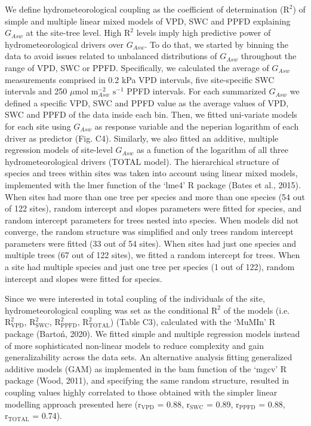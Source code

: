 \documentclass[11pt,twoside]{reedthesis}
\begin{document}
We define hydrometeorological coupling as the coefficient of
determination (\(\text{R}^2\)) of simple and multiple linear mixed
models of VPD, SWC and PPFD explaining \(G_{Asw}\) at the site-tree
level. High \(\text{R}^2\) levels imply high predictive power of
hydrometeorological drivers over \(G_{Asw}\). To do that, we started by
binning the data to avoid issues related to unbalanced distributions of
\(G_{Asw}\) throughout the range of VPD, SWC or PPFD. Specifically, we
calculated the average of \(G_{Asw}\) measurements comprised in 0.2 kPa
VPD intervals, five site-specific SWC intervals and 250 \(\mu\)mol
\(\text{m}^{-2}_{Asw}\) \(\text{s}^{-1}\) PPFD intervals. For each
summarized \(G_{Asw}\) we defined a specific VPD, SWC and PPFD value as
the average values of VPD, SWC and PPFD of the data inside each bin.
Then, we fitted uni-variate models for each site using \(G_{Asw}\) as
response variable and the neperian logarithm of each driver as predictor
(Fig. C4). Similarly, we also fitted an additive, multiple regression
models of site-level \(G_{Asw}\) as a function of the logarithm of all
three hydrometeorological drivers (TOTAL model). The hierarchical
structure of species and trees within sites was taken into account using
linear mixed models, implemented with the lmer function of the `lme4' R
package (Bates et al., 2015). When sites had more than one tree per
species and more than one species (54 out of 122 sites), random
intercept and slopes parameters were fitted for species, and random
intercept parameters for trees nested into species. When models did not
converge, the random structure was simplified and only trees random
intercept parameters were fitted (33 out of 54 sites). When sites had
just one species and multiple trees (67 out of 122 sites), we fitted a
random intercept for trees. When a site had multiple species and just
one tree per species (1 out of 122), random intercept and slopes were
fitted for species.\par

Since we were interested in total coupling of the individuals of the
site, hydrometeorological coupling was set as the conditional
\(\text{R}^2\) of the models (i.e. \(\text{R}^2_{\text{VPD}}\),
\(\text{R}^2_{\text{SWC}}\), \(\text{R}^2_{\text{PPFD}}\),
\(\text{R}^2_{\text{TOTAL}}\)) (Table C3), calculated with the `MuMIn' R
package (Bartoń, 2020). We fitted simple and multiple regression models
instead of more sophisticated non-linear models to reduce complexity and
gain generalizability across the data sets. An alternative analysis
fitting generalized additive models (GAM) as implemented in the bam
function of the `mgcv' R package (Wood, 2011), and specifying the same
random structure, resulted in coupling values highly correlated to those
obtained with the simpler linear modelling approach presented here
(\(\text{r}_{\text{VPD}}\) = 0.88, \(\text{r}_{\text{SWC}}\) = 0.89,
\(\text{r}_{\text{PPFD}}\) = 0.88, \(\text{r}_{\text{TOTAL}}\) =
0.74).\par
\end{document}
